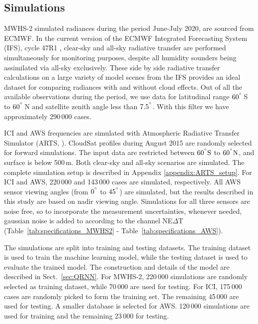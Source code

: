 \documentclass[amt, manuscript]{copernicus}
\begin{document}
\subsection{Simulations}
%
MWHS-2 simulated radiances during the period June-July 2020, are sourced from ECMWF. In the current version of the ECMWF Integrated Forecasting System (IFS), cycle 47R1 \citep{IFS47R1chap1}, clear-sky and all-sky radiative transfer are performed simultaneously for monitoring purposes, despite all humidity sounders being assimilated via all-sky exclusively. These side by side radiative transfer calculations on a large variety of model scenes from the IFS provides an ideal dataset for comparing radiances with and without cloud effects. Out of all the available observations during the period, we use data for latitudinal range $60^{^{\circ}}$\,S to $60^{^{\circ}}$\,N and satellite zenith angle less than $7.5^{^{\circ}}$. With this filter we have approximately 290\,000 cases.

ICI and AWS frequencies are simulated with Atmospheric Radiative Transfer Simulator (ARTS, \citet{buehler:artst:18}). CloudSat \citep{Stephens2002cloudsat} profiles during August 2015 are randomly selected for forward simulations. The input data are restricted between $60\unit{^{\degree}S}$ to $60\unit{^{\degree}N}$, and surface is below 500\,m. Both clear-sky and all-sky scenarios  are simulated. The complete simulation setup is described in Appendix \ref{appendix:ARTS_setup}. For ICI and AWS, 220\,000 and 143\,000 cases are simulated, respectively. All AWS sensor viewing angles (from $0^{^{\circ}}$ to $45^{^{\circ}}$) are simulated, but the results described in this study are based on nadir viewing angle. Simulations for all three sensors are noise free, so to incorporate the measurement uncertainties, whenever needed, gaussian noise is added to according to the channel NE$\Delta$T (Table~\ref{tab:specifications_MWHS2} - Table~\ref{tab:specifications_AWS}). 

The simulations are split into training and testing datasets. The training dataset is used to train the machine learning model, while the testing dataset is used to evaluate the trained model. The construction and details of the model are described in Sect.~\ref{sec:QRNN}. For MWHS-2, 220\,000 simulations are randomly selected as training dataset, while 70\,000 are used for testing. For ICI, 175\,000 cases are randomly picked to form the training set. The remaining 45\,000 are used for testing. A smaller database is selected for AWS. 120\,000 simulations are used for training and the remaining 23\,000 for testing.
\end{document}
